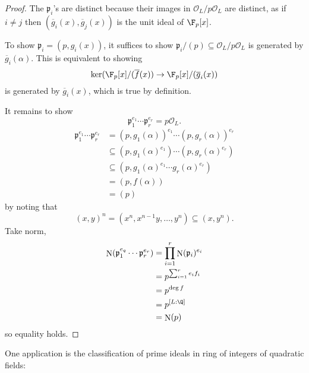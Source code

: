 \documentclass[a4paper]{article}
\renewcommand*{\O}{\mathcal{O}}
\DeclareMathOperator{\n}{N}
\newcommand*{\red}[1]{\overline{#1}} %
\begin{document}
\begin{proof}
  The \(\mathfrak p_i\)'s are distinct because their images in \(\O_L/p\O_L\) are distinct, as if \(i \neq j\) then \((\red g_i(x), \red g_j(x))\) is the unit ideal of \(\F_p[x]\).

  To show \(\mathfrak p_i = (p, g_i(x))\), it suffices to show \(\mathfrak p_i/(p) \subseteq \O_L/p\O_L\) is generated by \(\red g_i(\alpha)\). This is equivalent to showing
  \[
    \ker(\F_p[x]/(\red f(x)) \to \F_p[x]/(\red g_i(x))
  \]
  is generated by \(\red g_i(x)\), which is true by definition.

  It remains to show
  \[
    \mathfrak p_1^{e_1} \cdots \mathfrak p_r^{e_r} = p\O_L.
  \]
  \begin{align*}
    \mathfrak p_1^{e_1} \cdots \mathfrak p_r^{e_r}
    &= (p, g_1(\alpha))^{e_1} \cdots (p, g_r(\alpha))^{e_r} \\
    &\subseteq (p, g_1(\alpha)^{e_1}) \cdots (p, g_r(\alpha)^{e_r}) \\
    &\subseteq (p, g_1(\alpha)^{e_1} \cdots g_r(\alpha)^{e_r}) \\
    &= (p, f(\alpha)) \\
    &= (p)
  \end{align*}
  by noting that
  \[
    (x, y)^n = (x^n, x^{n - 1}y, \dots, y^n) \subseteq (x, y^n).
  \]
  Take norm,
  \begin{align*}
    \n(\mathfrak p_1^{e_q} \cdots \mathfrak p_r^{e_r})
    &= \prod_{i = 1}^r \n(\mathfrak p_i)^{e_i} \\
    &= p^{\sum_{i = 1}^re_if_i} \\
    &= p^{\deg f} \\
    &= p^{[L:\Q]} \\
    &= \n(p)
  \end{align*}
  so equality holds.
\end{proof}

One application is the classification of prime ideals in ring of integers of quadratic fields:
\end{document}
